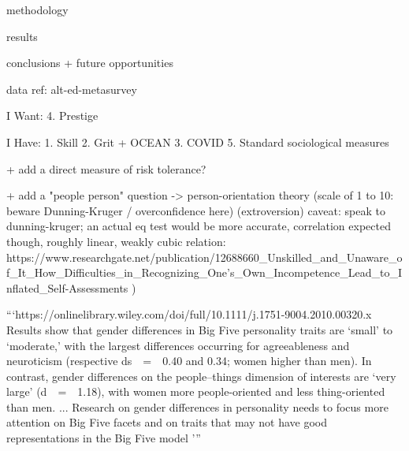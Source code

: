 \documentclass[review]{elsarticle}
\begin{document}
methodology

results

conclusions + future opportunities

data ref: alt-ed-metasurvey

I Want:
4. Prestige

I Have:
1. Skill
2. Grit + OCEAN
3. COVID
5. Standard sociological measures

+ add a direct measure of risk tolerance?


+ add a "people person" question -> person-orientation theory (scale of 1 to 10: beware Dunning-Kruger / overconfidence here) (extroversion)
caveat: speak to dunning-kruger; an actual eq test would be more accurate,
    correlation expected though, roughly linear,
    weakly cubic relation: https://www.researchgate.net/publication/12688660_Unskilled_and_Unaware_of_It_How_Difficulties_in_Recognizing_One's_Own_Incompetence_Lead_to_Inflated_Self-Assessments )

```https://onlinelibrary.wiley.com/doi/full/10.1111/j.1751-9004.2010.00320.x
Results show that gender differences in Big Five personality traits are ‘small’ to ‘moderate,’
with the largest differences occurring for agreeableness and neuroticism
(respective ds = 0.40 and 0.34; women higher than men). In contrast,
gender differences on the people–things dimension of interests are ‘very large’
(d = 1.18), with women more people-oriented and less thing-oriented than men.
...
Research on gender differences in personality needs to focus more attention on Big Five facets and on traits that may not have good representations in the Big Five model
'''
\end{document}
